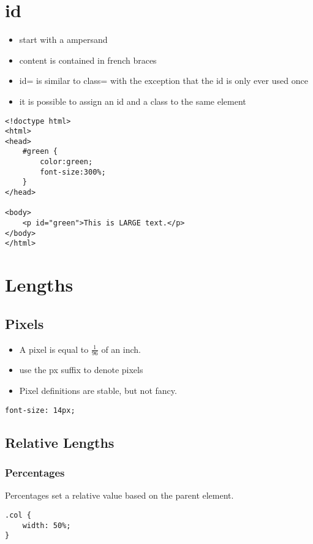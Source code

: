 \documentclass{article}
\begin{document}
\section{id}
\begin{itemize}
  \item start with a ampersand
  \item content is contained in french braces
  \item id= is similar to class= with the exception that the id is only ever
    used once
  \item it is possible to assign an id and a class to the same element
\end{itemize}
\begin{lstlisting}
<!doctype html>
<html>
<head>
    #green {
        color:green;
        font-size:300%;
    }
</head>

<body>
    <p id="green">This is LARGE text.</p>
</body>
</html>
\end{lstlisting}

\section{Lengths}

%
\subsection{Pixels}
\begin{itemize}
  \item A pixel is equal to $\frac{1}{96}$ of an inch.
  \item use the px suffix to denote pixels
  \item Pixel definitions are stable, but not fancy.
\end{itemize}
\begin{lstlisting}
font-size: 14px;
\end{lstlisting}

%
\subsection{Relative Lengths}
\subsubsection{Percentages}
Percentages set a relative value based on the parent element.

\begin{lstlisting}
.col {
    width: 50%;
}
\end{lstlisting}
\end{document}
